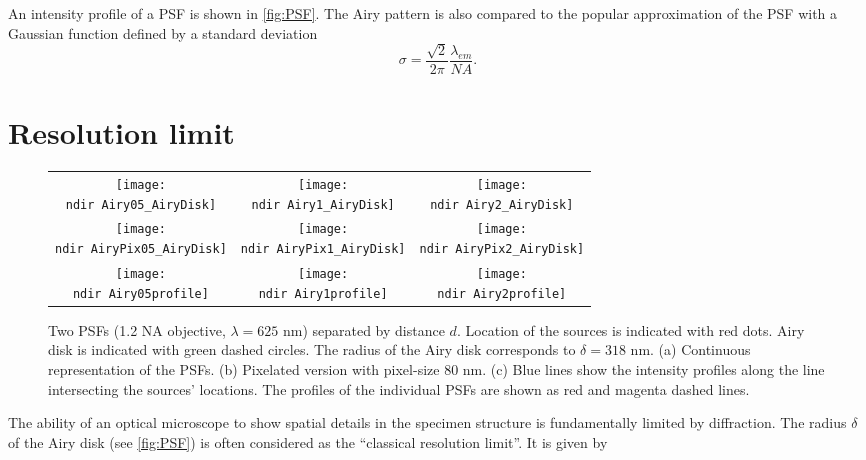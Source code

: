 An intensity profile of a PSF is shown in \autoref{fig:PSF}. The Airy pattern is also compared to the popular approximation of the PSF with a Gaussian function \cite{Zhang2007} defined by a standard deviation
%
\begin{equation}
	\sigma=\frac{\sqrt{2}}{2\pi}\frac{\lambda_{em}}{\unit{NA}}.
\end{equation}


\section{Resolution limit \label{sec:Resolution limit}}

\begin{figure}[!bht]
	\centering
	\newcommand{\wf}{.3\textwidth}	
	\newcommand{\ndir}{figures/psfillustration/}
	\begin{tabular}{ccc}
		\subfloat[$d=\delta/2$]{\texttt{[image: \\ndir Airy05\_AiryDisk]}}
		& \subfloat[$d=\delta$]{\texttt{[image: \\ndir Airy1\_AiryDisk]}}
		& \subfloat[$d=2\delta$]{\texttt{[image: \\ndir Airy2\_AiryDisk]}}
		\tabularnewline
		\subfloat[$d=\delta/2$]{\texttt{[image: \\ndir AiryPix05\_AiryDisk]}}
		& \subfloat[$d=\delta$]{\texttt{[image: \\ndir AiryPix1\_AiryDisk]}}
		& \subfloat[$d=2\delta$]{\texttt{[image: \\ndir AiryPix2\_AiryDisk]}}
		\tabularnewline
		\subfloat[$d=\delta/2$]{\texttt{[image: \\ndir Airy05profile]}}
		& \subfloat[$d=\delta$]{\texttt{[image: \\ndir Airy1profile]}}
		& \subfloat[$d=2\delta$]{\texttt{[image: \\ndir Airy2profile]}}
		\tabularnewline
	\end{tabular}
	\caption{Two PSFs (1.2 NA objective, $\lambda=625$ nm) separated by distance $d$. Location of the sources is indicated with red dots. Airy disk is indicated with green dashed circles. The radius of the Airy disk corresponds to $\delta=318$ nm. (a) Continuous representation of the PSFs. (b) Pixelated version with pixel-size 80 nm. (c) Blue lines show the intensity profiles along the line intersecting the sources' locations. The profiles of the individual PSFs are shown as red and magenta dashed lines.}
	\label{fig:Rayleigh}
\end{figure}
%
The ability of an optical microscope to show spatial details in the specimen structure is fundamentally limited by diffraction. The radius $\delta$ of the Airy disk (see \autoref{fig:PSF}) is often considered as the ``classical resolution limit''. It is given by
